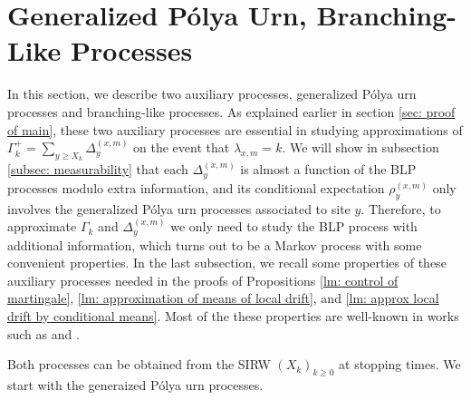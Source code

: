 \documentclass[twoside,12pt,a4paper]{article}
\numberwithin{equation}{section}
\begin{document}
	\section{Generalized P\'{o}lya Urn, Branching-Like Processes}\label{sec: generalized Polya Urn, BLP}

	In this section, we describe two auxiliary processes, generalized P\'{o}lya urn processes and branching-like processes. As explained earlier in section \ref{sec: proof of main}, these two auxiliary processes are essential in studying approximations of $\Gamma_k^+= \sum_{y\geq X_k} \Delta_{y}^{(x,m)}$ on the event that $\lambda_{x,m} = k$. We will show in subsection \ref{subsec: measurability} that each $\Delta^{(x,m)}_{y}$ is almost a function of the BLP processes modulo extra information, and its conditional expectation $\rho^{(x,m)}_{y}$ only involves the generalized P\'{o}lya urn processes associated to site $y$. Therefore, to approximate $\Gamma_k$ and $\Delta_{y}^{(x,m)}$ we only need to study the BLP process with additional information, which turns out to be a Markov process with some convenient properties. In the last subsection, we recall some properties of these auxiliary processes needed in the proofs of Propositions \ref{lm: control of martingale}, \ref{lm: approximation of means of local drift}, and \ref{lm: approx local drift by conditional means}. Most of the these properties are well-known in works such as \cite{KP16} and \cite{KMP22}. 
	
	Both processes can be obtained from the SIRW $(X_k)_{k\geq 0}$ at stopping times. We start with the generaized P\'{o}lya urn processes. 
\end{document}
